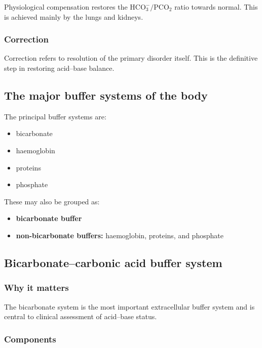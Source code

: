 \documentclass[11pt,a4paper]{article}
\begin{document}
Physiological compensation restores the \( \mathrm{HCO_3^- / PCO_2} \) ratio towards normal. This is achieved mainly by the lungs and kidneys.

\subsubsection{Correction}

Correction refers to resolution of the primary disorder itself. This is the definitive step in restoring acid--base balance.

\subsection{The major buffer systems of the body}

The principal buffer systems are:

\begin{itemize}
    \item bicarbonate
    \item haemoglobin
    \item proteins
    \item phosphate
\end{itemize}

These may also be grouped as:

\begin{itemize}
    \item \textbf{bicarbonate buffer}
    \item \textbf{non-bicarbonate buffers:} haemoglobin, proteins, and phosphate
\end{itemize}

\subsection{Bicarbonate--carbonic acid buffer system}

\subsubsection{Why it matters}

The bicarbonate system is the most important extracellular buffer system and is central to clinical assessment of acid--base status.

\subsubsection{Components}
\end{document}

